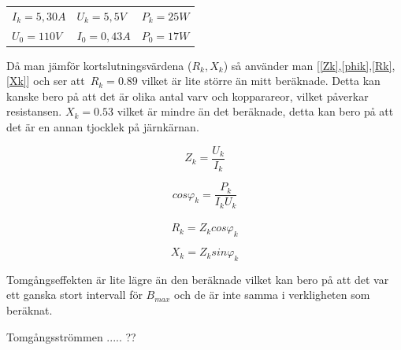 \documentclass{article}
\begin{document}
\begin{tabular}{l l l}
  $I_k = 5,30 A$ & $U_k = 5,5 V $&$ P_k = 25 W$\\
  $U_0 = 110 V $&$ I_0 = 0,43 A $&$ P_0 = 17 W$\\
\end{tabular}

Då man jämför kortslutningsvärdena ($R_k,X_k$) så använder man [\ref{Zk},\ref{phik},\ref{Rk},\ref{Xk}] och ser att\
$R_k= 0.89$ vilket är lite större än mitt beräknade.
Detta kan kanske bero på att det är olika antal varv och kopparareor, vilket påverkar resistansen.
$X_k= 0.53$ vilket är mindre än det beräknade, detta kan bero på att det är en annan tjocklek på järnkärnan.

\begin{equation}
  Z_k=\frac{U_k}{I_k}
  \label{Zk}
\end{equation}

\begin{equation}
  cos\varphi_k=\frac{P_k}{I_k U_k}
  \label{phik}
\end{equation}
\\
\begin{equation}
  R_k=Z_kcos\varphi_k
  \label{Rk}
\end{equation}

\begin{equation}
  X_k=Z_ksin\varphi_k
  \label{Xk}
\end{equation}


Tomgångseffekten är lite lägre än den beräknade vilket kan bero på att det var ett ganska stort intervall för $B_{max}$ och de är inte samma i verkligheten som beräknat.

Tomgångsströmmen ..... ??






\end{document}
